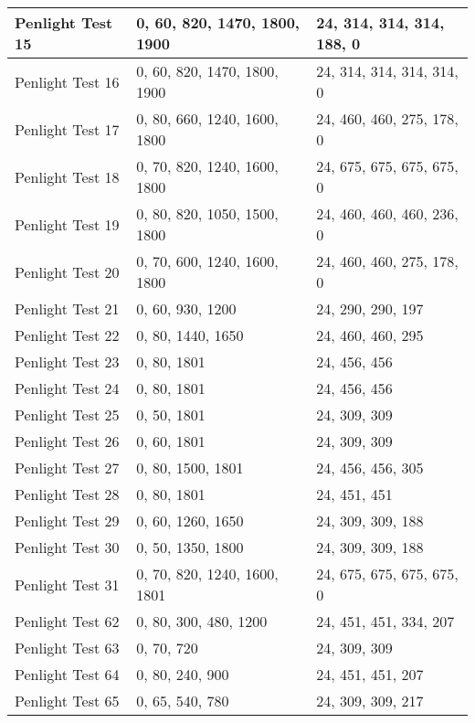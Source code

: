 \begin{table}[!ht]
\begin{center}
\begin{tabular}{|l|l|l|}
Penlight Test 15  &  0, 60, 820, 1470, 1800, 1900  &  24, 314, 314, 314, 188, 0  \\ \hline
Penlight Test 16  &  0, 60, 820, 1470, 1800, 1900  &  24, 314, 314, 314, 314, 0  \\ \hline
Penlight Test 17  &  0, 80, 660, 1240, 1600, 1800  &  24, 460, 460, 275, 178, 0  \\ \hline
Penlight Test 18  &  0, 70, 820, 1240, 1600, 1800  &  24, 675, 675, 675, 675, 0  \\ \hline
Penlight Test 19  &  0, 80, 820, 1050, 1500, 1800  &  24, 460, 460, 460, 236, 0  \\ \hline
Penlight Test 20  &  0, 70, 600, 1240, 1600, 1800  &  24, 460, 460, 275, 178, 0  \\ \hline
Penlight Test 21  &  0, 60, 930, 1200              &  24, 290, 290, 197          \\ \hline
Penlight Test 22  &  0, 80, 1440, 1650             &  24, 460, 460, 295          \\ \hline
Penlight Test 23  &  0, 80, 1801                   &  24, 456, 456               \\ \hline
Penlight Test 24  &  0, 80, 1801                   &  24, 456, 456               \\ \hline
Penlight Test 25  &  0, 50, 1801                   &  24, 309, 309               \\ \hline
Penlight Test 26  &  0, 60, 1801                   &  24, 309, 309               \\ \hline
Penlight Test 27  &  0, 80, 1500, 1801             &  24, 456, 456, 305          \\ \hline
Penlight Test 28  &  0, 80, 1801                   &  24, 451, 451               \\ \hline
Penlight Test 29  &  0, 60, 1260, 1650             &  24, 309, 309, 188          \\ \hline
Penlight Test 30  &  0, 50, 1350, 1800             &  24, 309, 309, 188          \\ \hline
Penlight Test 31  &  0, 70, 820, 1240, 1600, 1801  &  24, 675, 675, 675, 675, 0  \\ \hline
Penlight Test 62  &  0, 80, 300, 480, 1200         &  24, 451, 451, 334, 207     \\ \hline
Penlight Test 63  &  0, 70, 720                    &  24, 309, 309               \\ \hline
Penlight Test 64  &  0, 80, 240, 900               &  24, 451, 451, 207          \\ \hline
Penlight Test 65  &  0, 65, 540, 780               &  24, 309, 309, 217          \\ \hline
\end{tabular}
\end{center}
\end{table}


